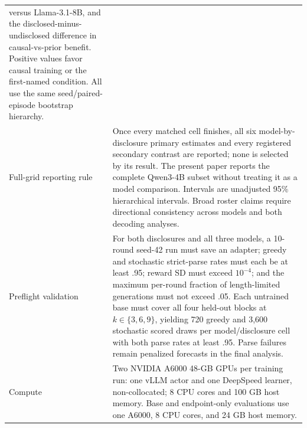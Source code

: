 \begin{center}
\begin{minipage}{\linewidth}
\begin{tabular}{p{.29\linewidth}p{.66\linewidth}}
versus Llama-3.1-8B, and the disclosed-minus-undisclosed difference in
causal-vs-prior benefit.  Positive values favor causal training or the first-named
condition. All use the same seed/paired-episode bootstrap hierarchy. \\
Full-grid reporting rule & Once every matched cell finishes, all six
model-by-disclosure primary estimates and every registered secondary contrast are
reported; none is selected by its result. The present paper reports the complete
Qwen3-4B subset without treating it as a model comparison. Intervals are unadjusted
95\% hierarchical intervals. Broad roster claims require directional consistency
across models and both decoding analyses. \\
Preflight validation & For both disclosures and all three models, a 10-round
seed-42 run must save an adapter; greedy and stochastic strict-parse rates must
each be at least .95; reward SD must exceed $10^{-4}$; and the maximum per-round
fraction of length-limited generations must not exceed .05. Each untrained base
must cover all four held-out blocks at $k\in\{3,6,9\}$, yielding 720 greedy and
3,600 stochastic scored draws per model/disclosure cell with both parse rates at
least .95. Parse failures remain penalized forecasts in the final analysis. \\
Compute & Two NVIDIA A6000 48-GB GPUs per training run: one vLLM actor and one
DeepSpeed learner, non-collocated; 8 CPU cores and 100 GB host memory.  Base and
endpoint-only evaluations use one A6000, 8 CPU cores, and 24 GB host memory. \\
\bottomrule
\end{tabular}
\end{minipage}
\end{center}
